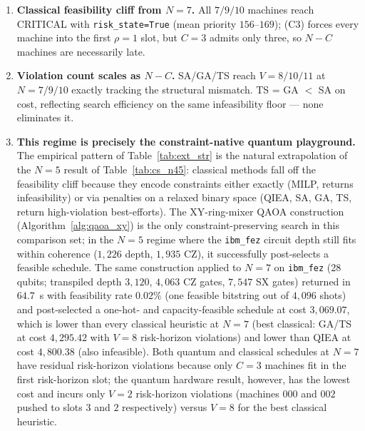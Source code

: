 \begin{enumerate}
    \item \textbf{Classical feasibility cliff from $N=7$.} All $7/9/10$ machines reach CRITICAL with \texttt{risk\_state=True} (mean priority $156$--$169$); (C3) forces every machine into the first $\rho=1$ slot, but $C=3$ admits only three, so $N-C$ machines are necessarily late.
    \item \textbf{Violation count scales as $N-C$.} SA/GA/TS reach $V=8/10/11$ at $N=7/9/10$ exactly tracking the structural mismatch. TS = GA $<$ SA on cost, reflecting search efficiency on the same infeasibility floor — none eliminates it.
    \item \textbf{This regime is precisely the constraint-native
    quantum playground.} The empirical pattern of
    Table~\ref{tab:ext_str} is the natural extrapolation
    of the $N=5$ result of Table~\ref{tab:cs_n45}:
    classical methods fall off the feasibility cliff because they
    encode constraints either exactly (MILP, returns infeasibility)
    or via penalties on a relaxed binary space (QIEA, SA, GA, TS,
    return high-violation best-efforts). The XY-ring-mixer QAOA
    construction (Algorithm~\ref{alg:qaoa_xy}) is the only
    constraint-preserving search in this comparison set; in the
    $N=5$ regime where the \texttt{ibm\_fez} circuit depth still
    fits within coherence ($1{,}226$ depth, $1{,}935$ CZ), it
    successfully post-selects a feasible schedule. The same
    construction applied to $N=7$ on \texttt{ibm\_fez} (28 qubits;
    transpiled depth $3{,}120$, $4{,}063$ CZ gates, $7{,}547$ SX
    gates) returned in $64.7$~s with feasibility rate $0.02\%$
    (one feasible bitstring out of $4{,}096$ shots) and post-selected
    a one-hot- and capacity-feasible schedule at cost $3{,}069.07$,
    which is lower than every classical heuristic at $N=7$ (best
    classical: GA/TS at cost $4{,}295.42$ with $V=8$
    risk-horizon violations) and lower than QIEA at cost
    $4{,}800.38$ (also infeasible). Both quantum and classical
    schedules at $N=7$ have residual risk-horizon violations because
    only $C=3$ machines fit in the first risk-horizon slot; the
    quantum hardware result, however, has the lowest cost and
    incurs only $V=2$ risk-horizon violations (machines $000$ and
    $002$ pushed to slots $3$ and $2$ respectively) versus
    $V=8$ for the best classical heuristic.


\end{enumerate}
